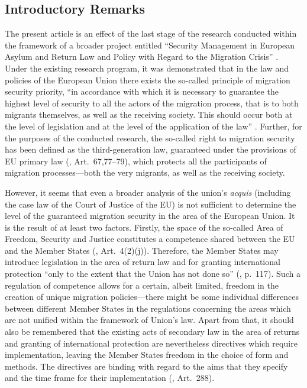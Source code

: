\documentclass[10pt,a4paper]{article}
\begin{document}
\vspace*{10mm}
\begin{multicols}{2}

\section{Introductory Remarks}

\noindent The present article is an effect of the last stage of the research conducted within the framework of a broader project entitled ``Security Management in European Asylum and Return Law and Policy with Regard to the Migration Crisis'' \citep{R1}. Under the existing research program, it was demonstrated that in the law and policies of the European Union there exists the so-called principle of migration security priority, ``in accordance with which it is necessary to guarantee the highest level of security to all the actors of the migration process, that is to both migrants themselves, as well as the receiving society. This should occur both at the level of legislation and at the level of the application of the law'' \citep{R2}. Further, for the purposes of the conducted research, the so-called right to migration security has been defined as the third-generation law, guaranteed under the provisions of EU primary law (\cite{R3}, Art.~67,77--79), which protects all the participants of migration processes---both the very migrants, as well as the receiving society.

However, it seems that even a broader analysis of the union's \textit{acquis} (including the case law of the Court of Justice of the EU) is not sufficient to determine the level of the guaranteed migration security in the area of the European Union. It is the result of at least two factors. Firstly, the space of the so-called Area of Freedom, Security and Justice constitutes a competence shared between the EU and the Member States (\cite{R3}, Art.~4(2)(j)). Therefore, the Member States may introduce legislation in the area of return law and for granting international protection ``only to the extent that the Union has not done so'' (\citep{R4}, p.~117). Such a regulation of competence allows for a certain, albeit limited, freedom in the creation of unique migration policies---there might be some individual differences between different Member States in the regulations concerning the areas which are not unified within the framework of Union's law. Apart from that, it should also be remembered that the existing acts of secondary law in the area of returns and granting of international protection are nevertheless directives which require implementation, leaving the Member States freedom in the choice of form and methods. The directives are binding with regard to the aims that they specify and the time frame for their implementation (\cite{R3}, Art.~288).


\end{multicols}
\end{document}
